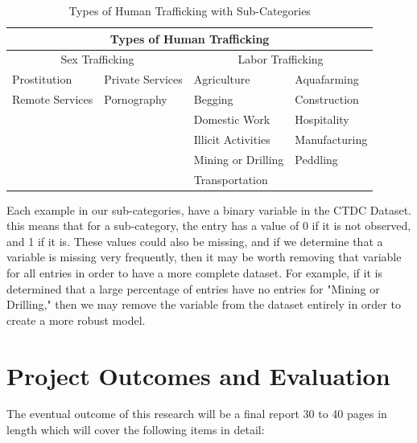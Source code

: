 \documentclass{article} %
\begin{document}
\FloatBarrier
\begin{table}[htb]
	\begin{tabular}{ |p{3cm}|p{3cm}||p{3cm}|p{3cm}|  }
		\hline
		\multicolumn{4}{|c|}{Types of Human Trafficking}                                 \\ \hline
		\multicolumn{2}{|c||}{Sex Trafficking} & \multicolumn{2}{|c|}{Labor Trafficking} \\ \hline
		Prostitution    & Private Services     & Agriculture        & Aquafarming        \\
		Remote Services & Pornography          & Begging            & Construction       \\
		&                      & Domestic Work      & Hospitality        \\
		&                      & Illicit Activities & Manufacturing      \\
		&                      & Mining or Drilling & Peddling           \\
		&                      & Transportation     &                    \\ \hline
	\end{tabular}
	\caption{Types of Human Trafficking with Sub-Categories}
\end{table}
\FloatBarrier

Each example in our sub-categories, have a binary variable in the CTDC Dataset. this means that for a sub-category, the entry has a value of 0 if it is not observed, and 1 if it is. These values could also be missing, and if we determine that a variable is missing very frequently, then it may be worth removing that variable for all entries in order to have a more complete dataset. For example, if it is determined that a large percentage of entries have no entries for "Mining or Drilling," then we may remove the variable from the dataset entirely in order to create a more robust model.

\section{Project Outcomes and Evaluation}

The eventual outcome of this research will be a final report 30 to 40 pages in length which will cover the following items in detail:
\end{document}
